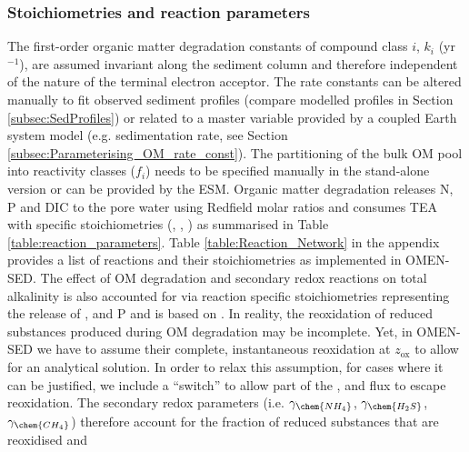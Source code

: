 \documentclass[gmd, manuscript]{copernicus}
\begin{document}
\subsubsection {Stoichiometries and reaction parameters}\label{subsubsec:Stoich_reaction_params}
The first-order organic matter degradation constants of compound class $i$, $k_i$ (yr$^{-1}$), are assumed invariant along the sediment column and therefore independent of the nature 
of the terminal electron acceptor. The rate constants can be altered manually to fit observed sediment profiles (compare modelled profiles in Section \ref{subsec:SedProfiles}) or related to a master variable 
provided by a coupled Earth system model (e.g. sedimentation rate, see Section \ref{subsec:Parameterising_OM_rate_const}). 
The partitioning of the bulk OM pool into reactivity classes ($f_i$) needs to be specified manually in the stand-alone version or can be provided by the ESM. 
Organic matter degradation releases N, P and DIC to the pore water using Redfield molar ratios \citep{redfield1963influence} and consumes TEA with specific stoichiometries (, , ) as summarised in Table \ref{table:reaction_parameters}. 
Table \ref{table:Reaction_Network} in the appendix provides a list of reactions and their stoichiometries as implemented in OMEN-SED. 
The effect of OM degradation and secondary redox reactions on total alkalinity is also accounted for via reaction specific stoichiometries representing the release of ,  and P and is based on \citet[][]{jourabchi_quantitative_2005}. 
In reality, the reoxidation of reduced substances produced during OM degradation may be incomplete. Yet, in OMEN-SED we have to assume their complete, instantaneous reoxidation at $z_\mathrm{ox}$ to allow for an analytical solution. 
In order to relax this assumption, for cases where it can be justified, we include a ``switch'' to allow part of the ,  and  flux to escape reoxidation. %
The secondary redox parameters (i.e. $\gamma_{\chem{NH_4}}$, $\gamma_{\chem{H_2S}}$, $\gamma_{\chem{CH_4}}$) therefore account for the fraction of reduced substances that are reoxidised and 
\end{document}
